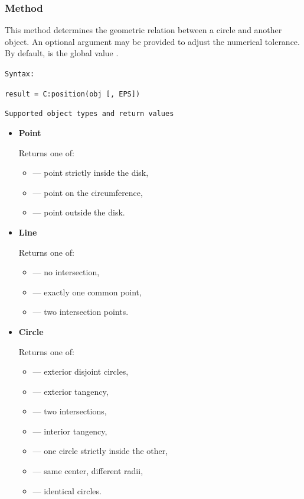 \subsubsection{Method }
\label{ssub:circle_position}

This method determines the geometric relation between a circle and another object.
An optional argument  may be provided to adjust the numerical tolerance.
By default,  is the global value .

\medskip
\texttt{Syntax:}

\verb|result = C:position(obj [, EPS])|

\medskip
\texttt{Supported object types and return values}

\begin{itemize}

\item \textbf{Point}

Returns one of:
\begin{itemize}
\item {}  — point strictly inside the disk,
\item {}  — point on the circumference,
\item {} — point outside the disk.
\end{itemize}

\item \textbf{Line}

Returns one of:
\begin{itemize}
\item {} — no intersection,
\item {}  — exactly one common point,
\item {}   — two intersection points.
\end{itemize}

\item \textbf{Circle}

Returns one of:
\begin{itemize}
\item {} — exterior disjoint circles,
\item {}  — exterior tangency,
\item {}        — two intersections,
\item {}  — interior tangency,
\item {} — one circle strictly inside the other,
\item {}    — same center, different radii,
\item {}    — identical circles.
\end{itemize}

\end{itemize}

